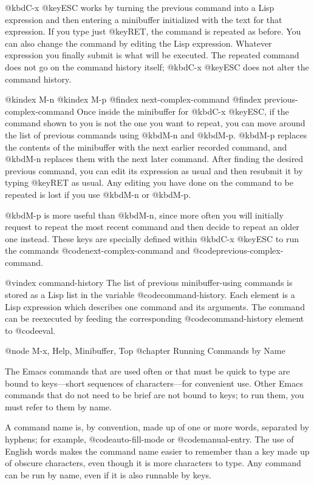 {{{{{  @kbd{C-x @key{ESC}} works by turning the previous command into a Lisp
expression and then entering a minibuffer initialized with the text for
that expression.  If you type just @key{RET}, the command is repeated as
before.  You can also change the command by editing the Lisp expression.
Whatever expression you finally submit is what will be executed.  The
repeated command does not go on the command history itself; @kbd{C-x
@key{ESC}} does not alter the command history.

@kindex M-n
@kindex M-p
@findex next-complex-command
@findex previous-complex-command
  Once inside the minibuffer for @kbd{C-x @key{ESC}}, if the command shown
to you is not the one you want to repeat, you can move around the list of
previous commands using @kbd{M-n} and @kbd{M-p}.  @kbd{M-p} replaces the
contents of the minibuffer with the next earlier recorded command, and
@kbd{M-n} replaces them with the next later command.  After finding the
desired previous command, you can edit its expression as usual and then
resubmit it by typing @key{RET} as usual.  Any editing you have done on the
command to be repeated is lost if you use @kbd{M-n} or @kbd{M-p}.

  @kbd{M-p} is more useful than @kbd{M-n}, since more often you will
initially request to repeat the most recent command and then decide to
repeat an older one instead.  These keys are specially defined within
@kbd{C-x @key{ESC}} to run the commands @code{next-complex-command} and
@code{previous-complex-command}.

@vindex command-history
  The list of previous minibuffer-using commands is stored as a Lisp list
in the variable @code{command-history}.  Each element is a Lisp expression
which describes one command and its arguments.  The command can be
reexecuted by feeding the corresponding @code{command-history} element to
@code{eval}.

@node M-x, Help, Minibuffer, Top
@chapter Running Commands by Name

  The Emacs commands that are used often or that must be quick to type are
bound to keys---short sequences of characters---for convenient use.  Other
Emacs commands that do not need to be brief are not bound to keys; to run
them, you must refer to them by name.

  A command name is, by convention, made up of one or more words, separated
by hyphens; for example, @code{auto-fill-mode} or @code{manual-entry}.  The
use of English words makes the command name easier to remember than a key
made up of obscure characters, even though it is more characters to type.
Any command can be run by name, even if it is also runnable by keys.

}}}}}

